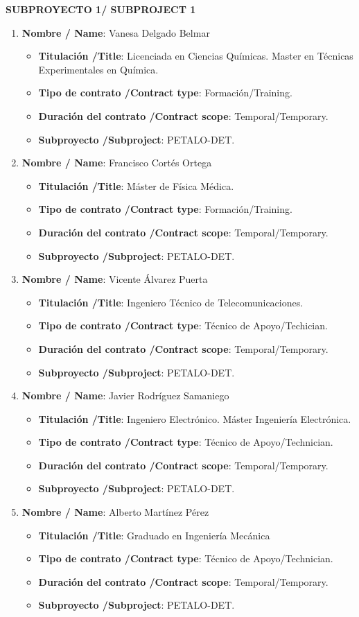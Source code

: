 \noindent\textbf{SUBPROYECTO 1/ SUBPROJECT 1}
\begin{enumerate}
\item {\bf Nombre / Name}: Vanesa Delgado Belmar
\begin{itemize}
\item {\bf Titulación /Title}:  Licenciada en Ciencias Químicas. Master en Técnicas Experimentales en Química.
\item {\bf Tipo de contrato /Contract type}: Formación/Training.
\item {\bf Duración del contrato /Contract scope}: Temporal/Temporary.
\item {\bf Subproyecto /Subproject}: PETALO-DET.
\end{itemize}
\item {\bf Nombre / Name}: Francisco Cortés Ortega
\begin{itemize}
\item {\bf Titulación /Title}: Máster de Física Médica.
\item {\bf Tipo de contrato /Contract type}: Formación/Training.
\item {\bf Duración del contrato /Contract scope}: Temporal/Temporary.
\item {\bf Subproyecto /Subproject}: PETALO-DET.
\end{itemize}
\item {\bf Nombre / Name}: Vicente Álvarez Puerta
\begin{itemize}
\item {\bf Titulación /Title}: Ingeniero Técnico de Telecomunicaciones.
\item {\bf Tipo de contrato /Contract type}: Técnico de Apoyo/Techician.
\item {\bf Duración del contrato /Contract scope}: Temporal/Temporary.
\item {\bf Subproyecto /Subproject}: PETALO-DET.
\end{itemize}
\item {\bf Nombre / Name}: Javier Rodríguez Samaniego
\begin{itemize}
\item {\bf Titulación /Title}: Ingeniero Electrónico. Máster Ingeniería Electrónica.
\item {\bf Tipo de contrato /Contract type}: Técnico de Apoyo/Technician.
\item {\bf Duración del contrato /Contract scope}: Temporal/Temporary.
\item {\bf Subproyecto /Subproject}: PETALO-DET.
\end{itemize}
\item {\bf Nombre / Name}: Alberto Martínez Pérez
\begin{itemize}
\item {\bf Titulación /Title}: Graduado en Ingeniería Mecánica
\item {\bf Tipo de contrato /Contract type}: Técnico de Apoyo/Technician.
\item {\bf Duración del contrato /Contract scope}: Temporal/Temporary.
\item {\bf Subproyecto /Subproject}: PETALO-DET.
\end{itemize}

\end{enumerate}

